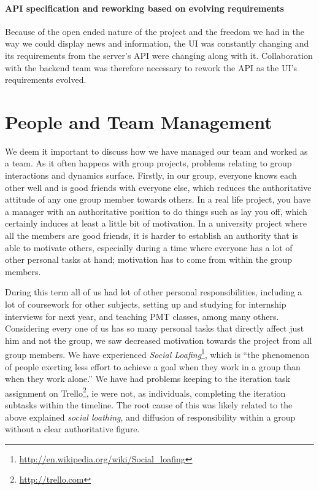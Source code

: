 \documentclass{report}
\begin{document}
    \paragraph{API specification and reworking based on evolving requirements}
    Because of the open ended nature of the project and the freedom we had in the way we could display news and information, the UI was constantly changing and its requirements from the server's API were changing along with it. Collaboration with the backend team was therefore necessary to rework the API as the UI's requirements evolved.
	  
	  
		\section{People and Team Management}

		We deem it important to discuss how we have managed our team and worked as a team. As it often happens with group projects, problems relating to group interactions and dynamics surface. Firstly, in our group, everyone knows each other well and is good friends with everyone else, which reduces the authoritative attitude of any one group member towards others. In a real life project, you have a manager with an authoritative position to do things such as lay you off, which certainly induces at least a little bit of motivation. In a university project where all the members are good friends, it is harder to establish an authority that is able to motivate others, especially during a time where everyone has a lot of other personal tasks at hand; motivation has to come from within the group members.

		During this term all of us had lot of other personal responsibilities, including a lot of coursework for other subjects, setting up and studying for internship interviews for next year, and teaching PMT classes, among many others. Considering every one of us has so many personal tasks that directly affect just him and not the group, we saw decreased motivation towards the project from all group members. We have experienced \emph{Social Loafing}\footnote{\url{http://en.wikipedia.org/wiki/Social_loafing}}, which is ``the phenomenon of people exerting less effort to achieve a goal when they work in a group than when they work alone.'' We have had problems keeping to the iteration task assignment on Trello\footnote{\url{http://trello.com}}, ie were not, as individuals, completing the iteration subtasks within the timeline. The root cause of this was likely related to the above explained \emph{social loathing}, and diffusion of responsibility within a group without a clear authoritative figure.
\end{document}
